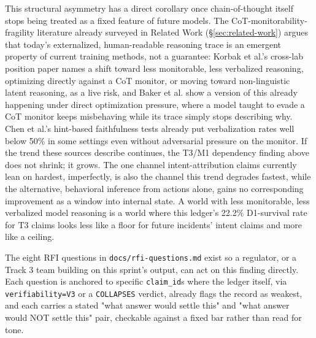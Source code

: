 \documentclass[10pt]{article}
\begin{document}
This structural asymmetry has a direct corollary once chain-of-thought
itself stops being treated as a fixed feature of future models. The
CoT-monitorability-fragility literature already surveyed in Related Work
(\S\ref{sec:related-work}) argues that today's externalized, human-readable
reasoning trace is an emergent property of current training methods, not a
guarantee: Korbak et al.'s cross-lab position paper names a shift toward
less monitorable, less verbalized reasoning, optimizing directly against a
CoT monitor, or moving toward non-linguistic latent reasoning, as a live
risk, and Baker et al. show a version of this already happening under
direct optimization pressure, where a model taught to evade a CoT monitor
keeps misbehaving while its trace simply stops describing why. Chen et al.'s
hint-based faithfulness tests already put verbalization rates well below
50\% in some settings even without adversarial pressure on the monitor. If
the trend these sources describe continues, the T3/M1 dependency finding
above does not shrink; it grows. The one channel intent-attribution claims
currently lean on hardest, imperfectly, is also the channel this trend
degrades fastest, while the alternative, behavioral inference from actions
alone, gains no corresponding improvement as a window into internal state.
A world with less monitorable, less verbalized model reasoning is a world
where this ledger's 22.2\% D1-survival rate for T3 claims looks less like a
floor for future incidents' intent claims and more like a ceiling.

The eight RFI questions in \texttt{docs/rfi-questions.md} exist so a
regulator, or a Track 3 team building on this sprint's output, can act on
this finding directly. Each question is anchored to specific
\texttt{claim\_id}s where the ledger itself, via \texttt{verifiability=V3}
or a \texttt{COLLAPSES} verdict, already flags the record as weakest, and
each carries a stated "what answer would settle this" and "what answer
would NOT settle this" pair, checkable against a fixed bar rather than read
for tone.
\end{document}
